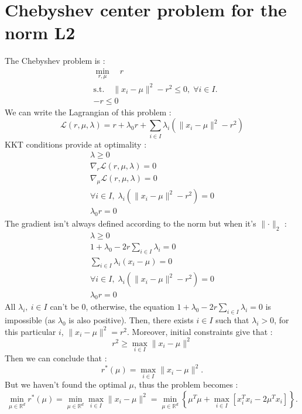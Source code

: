 \documentclass{amsart}
\newcommand{\RR}{\mathbb{R}}
\begin{document}
\section{Chebyshev center problem for the norm L2}
\label{chebyshev}
The Chebyshev problem is :
\begin{align*}
    &\min_{r,\mu} \quad r\\
    &\text{s.t.}\quad \lVert x_i-\mu\rVert^2-r^2 \leq 0, \;\forall i\in I.\\
    &-r\leq0
\end{align*}
We can write the Lagrangian of this problem : 
$$
\mathcal{L}(r,\mu,\lambda)=r+\lambda_0r+\sum_{i\in I}\lambda_i(\lVert x_i-\mu\rVert^2-r^2)
$$
KKT conditions provide at optimality : \begin{align*}
    \lambda\geq0\\
    \nabla_r\mathcal{L}(r,\mu,\lambda)=0\\
    \nabla_\mu\mathcal{L}(r,\mu,\lambda)=0\\
    \forall i\in I,\;\lambda_i(\lVert x_i-\mu\rVert^2-r^2)=0 \\
    \lambda_0r=0
\end{align*}
The gradient isn't always defined according to the norm but when it's $\lVert\cdot\rVert_2$ : 
\begin{align*}
    \lambda\geq0\\
    1+\lambda_0-2r\sum_{i\in I}\lambda_i=0\\
    \sum_{i\in I}\lambda_i(x_i-\mu)=0\\
    \forall i\in I,\;\lambda_i(\lVert x_i-\mu\rVert^2-r^2)=0 \\
    \lambda_0r=0
\end{align*}
All $\lambda_i, \: i\in I$ can't be $0$, otherwise, the equation $1+\lambda_0-2r\sum_{i\in I}\lambda_i=0$ is impossible (as $\lambda_0$ is also positive). Then, there exists $i\in I$ such that $\lambda_i>0$, for this particular $i$, $\lVert x_i-\mu\lVert^2=r^2$. Moreover, initial constraints give that :
$$
r^2\geq \max_{i\in I}\lVert x_i-\mu \rVert^2
$$
Then we can conclude that :
$$
r^*\left(\mu\right)=\max_{i\in I}\lVert x_i-\mu\rVert^2.
$$
But we haven't found the optimal $\mu$, thus the problem becomes : 
$$
\min_{\mu\in\RR^d}r^*\left(\mu\right)=\min_{\mu\in\RR^d}\max_{i\in I}\lVert x_i-\mu\rVert^2=\min_{\mu\in\RR^d}\left\{\mu^T\mu+\max_{i\in I}\left[x_i^Tx_i-2\mu^Tx_i\right]\right\}.
$$



\end{document}
